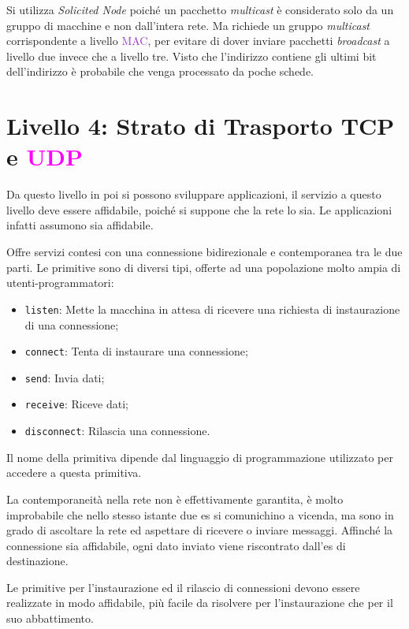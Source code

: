 \documentclass{article}
\numberwithin{equation}{subsection}
\begin{document}
Si utilizza \textit{Solicited Node} poiché un pacchetto \textit{multicast} è considerato solo da un gruppo di macchine e non dall'intera rete. 
Ma richiede un gruppo \textit{multicast} 
corrispondente a livello \textcolor{DarkOrchid}{MAC}, per evitare di dover inviare pacchetti \textit{broadcast} a livello due invece che a livello tre. Visto che l'indirizzo contiene gli ultimi bit 
dell'indirizzo è probabile che venga processato da poche schede. 

\clearpage

\section{Livello 4: Strato di Trasporto \textcolor{Bittersweet}{TCP} e \textcolor{Fuchsia}{UDP}}


Da questo livello in poi si possono sviluppare applicazioni, il servizio a questo livello deve essere affidabile, poiché si suppone che la rete lo sia. Le applicazioni infatti assumono sia affidabile. 

Offre servizi contesi con una connessione bidirezionale e contemporanea tra le due parti. 
Le primitive sono di diversi tipi, offerte ad una popolazione molto ampia di utenti-programmatori:
\begin{itemize}
    \item \texttt{listen}: Mette la macchina in attesa di ricevere una richiesta di instaurazione di una connessione;
    \item \texttt{connect}: Tenta di instaurare una connessione;
    \item \texttt{send}: Invia dati;
    \item \texttt{receive}: Riceve dati;
    \item \texttt{disconnect}: Rilascia una connessione. 
\end{itemize}
Il nome della primitiva dipende dal linguaggio di programmazione utilizzato per accedere a questa primitiva. 

La contemporaneità nella rete non è effettivamente garantita, è molto improbabile che  nello stesso istante due \textcolor{Periwinkle}{es} si comunichino a vicenda, ma sono in grado di 
ascoltare la rete ed aspettare di ricevere o inviare messaggi. Affinché la connessione sia affidabile, ogni dato inviato viene riscontrato dall'\textcolor{Periwinkle}{es} di destinazione. 

Le primitive per l'instaurazione ed il rilascio di connessioni devono essere realizzate in modo affidabile, più facile da risolvere per l'instaurazione che per il suo 
abbattimento. 
\end{document}
